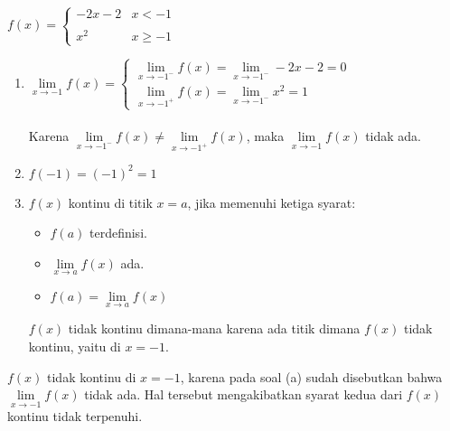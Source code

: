 \documentclass[10pt,openany,a4paper]{article}
\begin{document}
\begin{enumerate}
        $f(x)=\begin{cases}
        -2x-2&   x < -1\\
        \\
        x^2 &   x \geq -1
        \end{cases}$
        \begin{enumerate}
            \item $\lim\limits_{x\to-1}f(x)=\begin{cases}
                    \lim\limits_{x\to-1^-}f(x)=\lim\limits_{x\to-1^-}-2x-2=0\\
                    \lim\limits_{x\to-1^+}f(x)=\lim\limits_{x\to-1^-}x^2=1
                \end{cases}$\\~\\
                Karena $\lim\limits_{x\to-1^-}f(x)\neq\lim\limits_{x\to-1^+}f(x)$, maka $\lim\limits_{x\to-1}f(x)$ tidak ada.\\

            \item $f(-1)=(-1)^2=1$\\
            
            \item $f(x)$ kontinu di titik $x=a$, jika memenuhi ketiga syarat:
            \begin{itemize}
                \item $f(a)$ terdefinisi.
                \item $\lim\limits_{x\to a}f(x)$ ada.
                \item $f(a)=\lim\limits_{x\to a}f(x)$
            \end{itemize}
            $f(x)$ tidak kontinu dimana-mana karena ada titik dimana $f(x)$ tidak kontinu, yaitu di $x=-1$. 
        \end{enumerate}
        $f(x)$ tidak kontinu di $x=-1$, karena pada soal (a) sudah disebutkan bahwa $\lim\limits_{x\to-1}f(x)$ tidak ada. Hal tersebut mengakibatkan syarat kedua dari $f(x)$ kontinu tidak terpenuhi.\\~\\
        

\end{enumerate}
\end{document}
